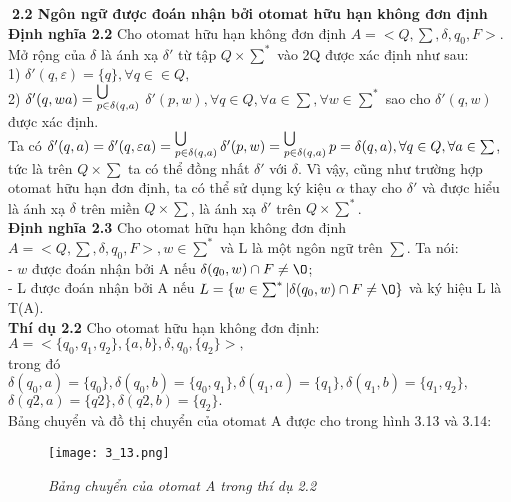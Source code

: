 \begin{flushleft}
\textbf{2.2 Ngôn ngữ được đoán nhận bởi otomat hữu hạn không đơn định}\\
\textbf{Định nghĩa 2.2} Cho otomat hữu hạn không đơn định $A = <Q, \sum, \delta, q_0, F>$. Mở rộng của $\delta$ là ánh xạ $\delta'$ từ tập $Q \times \sum^*$ vào 2Q được xác định như sau:\\
1) $\delta'(q, \varepsilon) = \{q\}, \forall q \in \in Q,$\\
2) $\delta'(q, wa) = \operatorname*{}_{p \in \delta(q,a)}^{\bigcup}$ $\delta ' ( p, w ) , \forall q\in Q, \forall a \in \sum, \forall w \in \sum^*$ sao cho $\delta'(q, w)$ được xác định.\\
Ta có $\delta'(q, a) = \delta'(q , \varepsilon a) = \operatorname*{}_{p \in \delta(q,a)}^{\bigcup} \delta ' ( p, w ) = \operatorname*{}_{p \in \delta(q,a)}^{\bigcup} p = \delta(q,a), \forall q \in Q, \forall a \in \sum$, tức là trên $Q \times \sum$ ta có thể đồng nhất $\delta'$ với $\delta$. Vì vậy, cũng như trường hợp otomat hữu hạn đơn định, ta có thể sử dụng ký kiệu $\alpha$ thay cho $\delta'$ và được hiểu là ánh xạ $\delta$ trên miền $Q \times \sum$, là ánh xạ $\delta'$ trên $Q \times \sum^*$.\\
\textbf{Định nghĩa 2.3} Cho otomat hữu hạn không đơn định $A = <Q, \sum, \delta, q_0, F>, w \in \sum^*$ và L là một ngôn ngữ trên $\sum$. Ta nói:\\
- $w$ được đoán nhận bởi A nếu $\delta(q_0, w) \cap F \ne \O$;\\
- L được đoán nhận bởi A nếu $L = \{w \in \sum^* | \delta(q_0, w) \cap F \ne \O\}$ và ký hiệu L là T(A). \\
\textbf{Thí dụ 2.2} Cho otomat hữu hạn không đơn định:\\
$A = <\{q_0, q_1, q_2\}, \{a, b\}, \delta, q_0, \{q_2\}>,$\\
trong đó $\delta(q_0, a) = \{q_0\}, \delta(q_0, b) = \{q_0, q_1\}, \delta(q_1, a) = \{q_1\}, \delta(q_1, b) = \{q_1, q_2\},$\\
\hspace{10mm}$\delta(q2, a) = \{q2\}, \delta(q2, b) = \{q_2\}.$\\
Bảng chuyển và đồ thị chuyển của otomat A được cho trong hình 3.13 và 3.14:\\
\begin{figure}[ht]
\texttt{[image: 3\_13.png]}
\caption{ \textit{Bảng chuyển của otomat A trong thí dụ 2.2}}
\end{figure}


\end{flushleft}

